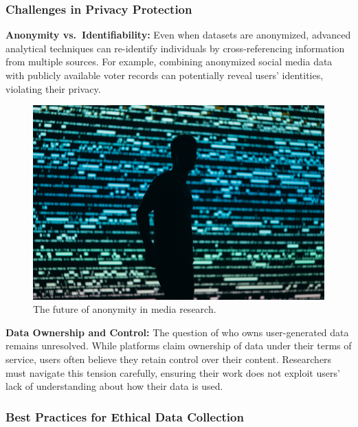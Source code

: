 \documentclass[
]{book}
\begin{document}
\subsubsection*{Challenges in Privacy Protection}\label{challenges-in-privacy-protection}

\textbf{Anonymity vs.~Identifiability:} Even when datasets are anonymized, advanced analytical techniques can re-identify individuals by cross-referencing information from multiple sources. For example, combining anonymized social media data with publicly available voter records can potentially reveal users' identities, violating their privacy.

\begin{figure}
\centering
\includegraphics[width=1\linewidth,height=\textheight,keepaspectratio]{images/anon-ident.jpg}
\caption{The future of anonymity in media research.}
\end{figure}

\textbf{Data Ownership and Control:} The question of who owns user-generated data remains unresolved. While platforms claim ownership of data under their terms of service, users often believe they retain control over their content. Researchers must navigate this tension carefully, ensuring their work does not exploit users' lack of understanding about how their data is used.

\subsubsection*{Best Practices for Ethical Data Collection}\label{best-practices-for-ethical-data-collection}
\end{document}
